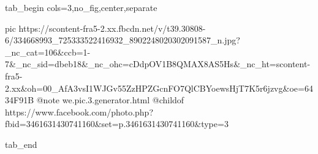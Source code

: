  
 
 
 
 


\ifcmt
  tab_begin cols=3,no_fig,center,separate

     pic https://scontent-fra5-2.xx.fbcdn.net/v/t39.30808-6/334668993_725333522416932_8902248020302091587_n.jpg?_nc_cat=106&ccb=1-7&_nc_sid=dbeb18&_nc_ohc=cDdpOV1B8QMAX8AS5Hs&_nc_ht=scontent-fra5-2.xx&oh=00_AfA3vsI1WJGv55ZzHPZGcnFO7QlCBYoewsHjT7K5r6jzvg&oe=6434F91B
		 @note we.pic.3.generator.html
		 @childof https://www.facebook.com/photo.php?fbid=3461631430741160&set=p.3461631430741160&type=3

  tab_end
\fi
